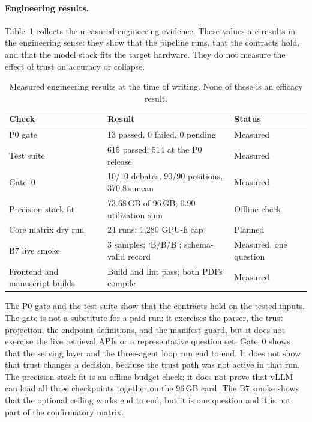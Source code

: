 \paragraph*{Engineering results.}
Table~\ref{tab:engineering-results} collects the measured engineering evidence. These values are results in the engineering sense: they show that the pipeline runs, that the contracts hold, and that the model stack fits the target hardware. They do not measure the effect of trust on accuracy or collapse.

\begin{table}[H]
  \centering
  \caption{Measured engineering results at the time of writing. None of these is an efficacy result.}
  \renewcommand{\arraystretch}{1.25}
  \small
  \begin{tabular}{|p{}|p{}|p{}|}
    \hline
    Check & Result & Status \\
    \hline
    P0 gate & 13 passed, 0 failed, 0 pending & Measured \\
    \hline
    Test suite & 615 passed; 514 at the P0 release & Measured \\
    \hline
    Gate~0 & 10/10 debates, 90/90 positions, 370.8\,s mean & Measured \\
    \hline
    Precision stack fit & 73.68\,GB of 96\,GB; 0.90 utilization sum & Offline check \\
    \hline
    Core matrix dry run & 24 runs; 1{,}280 GPU-h cap & Planned \\
    \hline
    B7 live smoke & 3 samples; `B/B/B'; schema-valid record & Measured, one question \\
    \hline
    Frontend and manuscript builds & Build and lint pass; both PDFs compile & Measured \\
    \hline
  \end{tabular}
  \label{tab:engineering-results}
\end{table}

The P0 gate and the test suite show that the contracts hold on the tested inputs. The gate is not a substitute for a paid run: it exercises the parser, the trust projection, the endpoint definitions, and the manifest guard, but it does not exercise the live retrieval APIs or a representative question set. Gate~0 shows that the serving layer and the three-agent loop run end to end. It does not show that trust changes a decision, because the trust path was not active in that run. The precision-stack fit is an offline budget check; it does not prove that vLLM can load all three checkpoints together on the 96\,GB card. The B7 smoke shows that the optional ceiling works end to end, but it is one question and it is not part of the confirmatory matrix.

